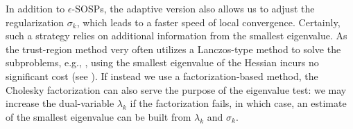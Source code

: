         

In addition to  $\epsilon$-SOSPs, the adaptive version also allows us to adjust the regularization $\sigma_k$, which leads to a faster speed of local convergence. Certainly, such a strategy relies on additional information from the smallest eigenvalue.
As the trust-region method very often utilizes a Lanczos-type method to solve the subproblems, e.g., \cite{cartis2022evaluation,conn2000trust},  using the smallest eigenvalue of the Hessian incurs no significant cost (see \cite{gratton2023yet,hamad2022consistently}). If instead we use a factorization-based method, the Cholesky factorization can also serve the purpose of the eigenvalue test: we may increase the dual-variable $\lambda_k$ if the factorization fails, in which case, an estimate of the smallest eigenvalue can be built from $\lambda_k$ and $\sigma_k$. 

